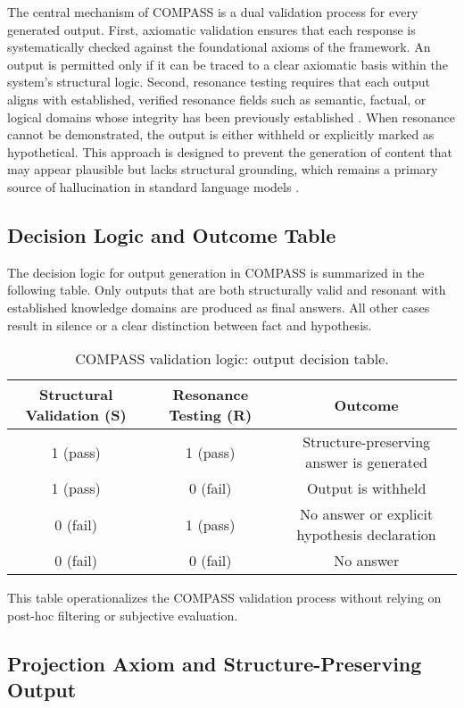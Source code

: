 \documentclass[11pt,a4paper]{article}
\begin{document}
The central mechanism of COMPASS is a dual validation process for every generated output. First, axiomatic validation ensures that each response is systematically checked against the foundational axioms of the framework. An output is permitted only if it can be traced to a clear axiomatic basis within the system’s structural logic. Second, resonance testing requires that each output aligns with established, verified resonance fields such as semantic, factual, or logical domains whose integrity has been previously established \cite{ji2021deep,chen2021knowledge}. When resonance cannot be demonstrated, the output is either withheld or explicitly marked as hypothetical. This approach is designed to prevent the generation of content that may appear plausible but lacks structural grounding, which remains a primary source of hallucination in standard language models \cite{brown2020language,lewis2020retrieval}.

\subsection{Decision Logic and Outcome Table}

The decision logic for output generation in COMPASS is summarized in the following table. Only outputs that are both structurally valid and resonant with established knowledge domains are produced as final answers. All other cases result in silence or a clear distinction between fact and hypothesis.

\begin{table}[h!]
\centering
\begin{tabular}{ccc}
\toprule
\textbf{Structural Validation (S)} & \textbf{Resonance Testing (R)} & \textbf{Outcome} \\
\midrule
1 (pass) & 1 (pass) & Structure-preserving answer is generated \\
1 (pass) & 0 (fail) & Output is withheld \\
0 (fail) & 1 (pass) & No answer or explicit hypothesis declaration \\
0 (fail) & 0 (fail) & No answer \\
\bottomrule
\end{tabular}
\caption{COMPASS validation logic: output decision table.}
\end{table}

This table operationalizes the COMPASS validation process without relying on post-hoc filtering or subjective evaluation.

\subsection{Projection Axiom and Structure-Preserving Output}
\end{document}
